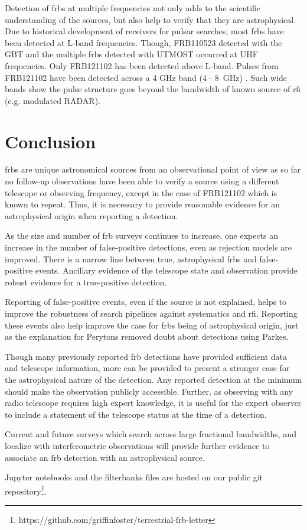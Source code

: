 \documentclass[a4paper,fleqn,usenatbib]{mnras}
\begin{document}
Detection of \glspl{frb} at multiple frequencies not only adds to the scientific
understanding of the sources, but also help to verify that they are
astrophysical.  Due to historical development of receivers for pulsar searches,
most \glspl{frb} have been detected at L-band frequencies. Though, FRB110523
detected with the GBT and the multiple \glspl{frb} detected with UTMOST occurred
at UHF frequencies.  Only FRB121102 has been detected above L-band.  Pulses from
FRB121102 have been detected across a 4 GHz band (4 - 8~GHz) \citep{atel10675}.
Such wide bands show the pulse structure goes beyond the bandwidth of known
source of \gls{rfi} (e.g. modulated RADAR).

\section{Conclusion}

\glspl{frb} are unique astronomical sources from an observational point of view
as so far no follow-up observations have been able to verify a source using a
different telescope or observing frequency, except in the case of FRB121102
which is known to repeat. Thus, it is necessary to provide reasonable evidence
for an astrophysical origin when reporting a detection. 

As the size and number of \gls{frb} surveys continues to increase, one expects
an increase in the number of false-positive detections, even as rejection models
are improved. There is a narrow line between true, astrophysical \glspl{frb} and
false-positive events. Ancillary evidence of the telescope state and observation
provide robust evidence for a true-positive detection. 

Reporting of false-positive events, even if the source is not explained, helps
to improve the robustness of search pipelines against systematics and \gls{rfi}.
Reporting these events also help improve the case for \glspl{frb} being of
astrophysical origin, just as the explanation for Perytons
\citep{2015MNRAS.451.3933P} removed doubt about detections using Parkes.

Though many previously reported \gls{frb} detections have provided sufficient
data and telescope information, more can be provided to present a stronger case
for the astrophysical nature of the detection. Any reported detection at the
minimum should make the observation publicly accessible. Further, as
observing with any radio telescope requires high expert knowledge, it is useful
for the expert observer to include a statement of the telescope status at the
time of a detection.

Current and future surveys which search across large fractional bandwidths, and
localize with interferometric observations will provide further evidence to
associate an \gls{frb} detection with an astrophysical source.

Jupyter notebooks and the filterbanks files are hosted on our
public git
repository\footnote{https://github.com/griffinfoster/terrestrial-frb-letter}.


 

\bsp	%
\label{lastpage}
\end{document}
